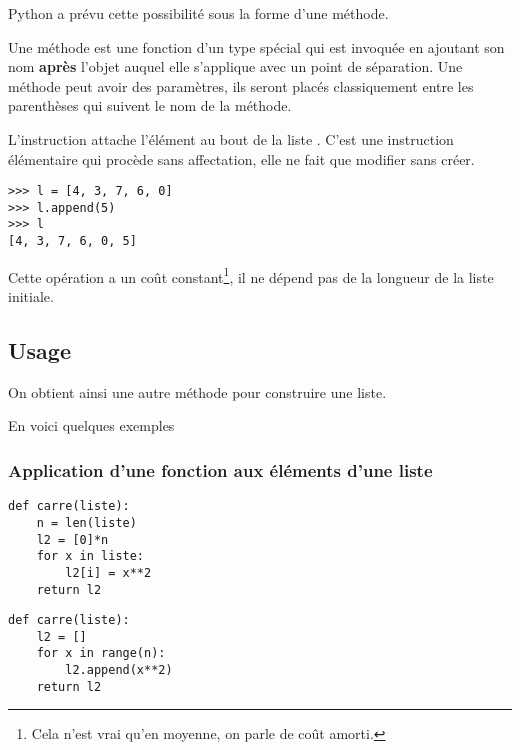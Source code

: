 Python a prévu cette possibilité sous la forme d'une méthode.

\begin{defin}[Méthode]
Une méthode est une fonction d'un type spécial qui est invoquée en ajoutant son nom {\bf après} l'objet auquel elle s'applique avec un point de séparation. Une méthode peut avoir des paramètres, ils seront placés classiquement entre les parenthèses qui suivent le nom de la méthode.
\end{defin}
\begin{defin}[append]
L'instruction  attache l'élément  au bout de la liste . C'est une instruction élémentaire qui procède sans affectation, elle ne fait que modifier sans créer.
\end{defin}
\begin{lstlisting}
>>> l = [4, 3, 7, 6, 0]
>>> l.append(5)
>>> l
[4, 3, 7, 6, 0, 5]
\end{lstlisting}
Cette opération a un coût constant\footnote{Cela n'est vrai qu'en moyenne, on parle de coût amorti.}, il ne dépend pas de la longueur de la liste initiale.
\subsection{Usage}
On obtient ainsi une autre méthode pour construire une liste.

En voici quelques exemples
\subsubsection{Application d'une fonction aux éléments d'une liste}
\begin{multicols}{2}
\setlength{\columnseprule}{1pt}

\begin{lstlisting}[frame=no]
def carre(liste):
    n = len(liste)
    l2 = [0]*n
    for x in liste:
        l2[i] = x**2
    return l2
\end{lstlisting}

\begin{lstlisting}[frame=no]
def carre(liste):
    l2 = []
    for x in range(n):
        l2.append(x**2)
    return l2
\end{lstlisting}
\end{multicols}


